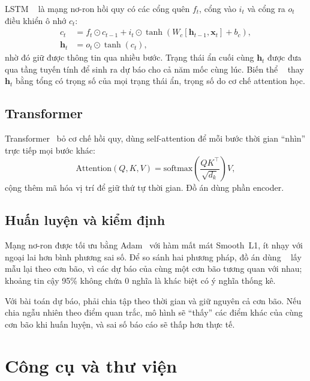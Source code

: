 LSTM ~\cite{Hochreiter1997} là mạng nơ-ron hồi quy
có các cổng quên $f_t$, cổng vào $i_t$ và cổng ra $o_t$ điều khiển ô nhớ $c_t$:
\begin{equation}
\begin{aligned}
c_t &= f_t \odot c_{t-1} + i_t \odot \tanh(W_c[\mathbf{h}_{t-1}, \mathbf{x}_t] + b_c),\\
\mathbf{h}_t &= o_t \odot \tanh(c_t),
\end{aligned}
\end{equation}
nhờ đó giữ được thông tin qua nhiều bước. Trạng thái ẩn cuối cùng
$\mathbf{h}_t$ được đưa qua tầng tuyến tính để sinh ra dự báo cho cả năm mốc
cùng lúc. Biến thể ~\cite{Bahdanau2015} thay $\mathbf{h}_t$
bằng tổng có trọng số của mọi trạng thái ẩn, trọng số do cơ chế attention học.

\subsection{Transformer}

Transformer~\cite{Vaswani2017} bỏ cơ chế hồi quy, dùng self-attention để mỗi
bước thời gian ``nhìn'' trực tiếp mọi bước khác:
\begin{equation}
\mathrm{Attention}(Q, K, V) = \mathrm{softmax}\!\left(\frac{QK^\top}{\sqrt{d_k}}\right) V,
\end{equation}
cộng thêm mã hóa vị trí để giữ thứ tự thời gian. Đồ án dùng phần encoder.

\subsection{Huấn luyện và kiểm định}

Mạng nơ-ron được tối ưu bằng Adam~\cite{Kingma2015} với hàm mất mát Smooth~L1,
ít nhạy với ngoại lai hơn bình phương sai số. Để so sánh hai phương pháp,
đồ án dùng ~\cite{Efron1993} lấy mẫu lại theo cơn bão, vì các
dự báo của cùng một cơn bão tương quan với nhau; khoảng tin cậy 95\% không
chứa 0 nghĩa là khác biệt có ý nghĩa thống kê.

\begin{ghinho}
Với bài toán dự báo, phải chia tập theo thời gian và giữ nguyên cả cơn bão.
Nếu chia ngẫu nhiên theo điểm quan trắc, mô hình sẽ ``thấy'' các điểm khác của
cùng cơn bão khi huấn luyện, và sai số báo cáo sẽ thấp hơn thực tế.
\end{ghinho}

\section{Công cụ và thư viện}

